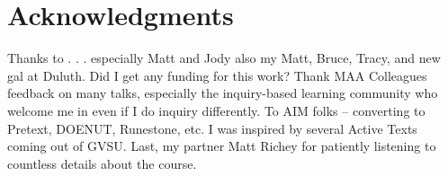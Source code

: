 \section*{Acknowledgments}

Thanks to . . . especially Matt and Jody  also my Matt, Bruce, Tracy, and new gal at Duluth.  Did I get any funding for this work?  Thank MAA Colleagues feedback on many talks, especially the inquiry-based learning community who welcome me in even if I do inquiry differently.  To AIM folks -- converting to Pretext, DOENUT, Runestone, etc.  I was inspired by several Active Texts coming out of GVSU.  Last, my partner Matt Richey for patiently listening to countless details about the course.

%
%
%


